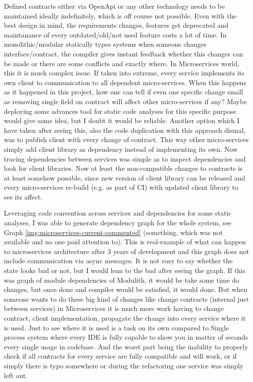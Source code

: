 Defined contracts either via OpenApi or any other technology needs to be maintained ideally indefinitely, which is off course not possible. Even with the best design in mind, the requirements changes, features get deprecated and maintanance of every outdated/old/not used feature costs a lot of time. In monolithic/modular statically types systems when someone changes interface/contract, the compiler gives instant feedback whether this changes can be made or there are some conflicts and exactly where. In Microservices world, this it is much complex issue. If taken into extreme, every service implements its own client to communication to all dependent micro-services. When this happens as it happened in this project, how one can tell if even one specific change small as removing single field on contract will affect other micro-services if any? Maybe deploying some advances tool for static code analyses for this specific purpose would give some idea, but I doubt it would be reliable. Another option which I have taken after seeing this, also the code duplication with this approach dismal, was to publish client with every change of contract. This way other micro-services simply add client library as dependency instead of implementing its own. Now tracing dependencies between services was simple as to inspect dependencies and look for client libraries. Now at least the non-compatible changes to contracts is at least somehow possible, since new version of client library can be released and every micro-services re-build (e.g. as part of CI) with updated client library to see its affect.

Leveraging code convention across services and dependencies for some static analyses, I was able to generate dependency graph for the whole system, see Graph \ref{img:microservices-current-commented} (something, which was not available and no one paid attention to). This is real-example of what can happen to microservices architecture after 3 years of development and this graph does not include communication via async messages. It is not easy to say whether the state looks bad or not, but I would lean to the bad after seeing the graph. If this was graph of module dependencies of Modulith, it would be take some time do changes, but once done and compiler would be satisfied, it would done. But when someone wants to do these big kind of changes like change contracts (internal just between services) in Microservices it is much more work having to change contract, client implementation, propagate the change into every service where it is used. Just to see where it is used is a task on its own compared to Single process system where every IDE is fully capable to show you in matter of seconds every single usage in codebase. And the worst part being the inability to properly check if all contracts for every service are fully compatible and will work, or if simply there is typo somewhere or during the refactoring one service was simply left out.

